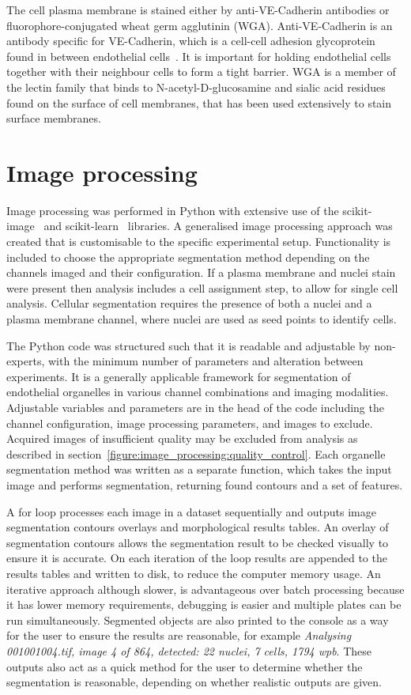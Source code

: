 The cell plasma membrane is stained either by anti-VE-Cadherin antibodies or fluorophore-conjugated wheat germ agglutinin (WGA). Anti-VE-Cadherin is an antibody specific for VE-Cadherin, which is a cell-cell adhesion glycoprotein found in between endothelial cells~\cite{Vestweber2008}. It is important for holding endothelial cells together with their neighbour cells to form a tight barrier. WGA is a member of the lectin family that binds to N-acetyl-D-glucosamine and sialic acid residues found on the surface of cell membranes, that has been used extensively to stain surface membranes.

\section{Image processing}
\label{endothelial_morphometry:image_processing}
Image processing was performed in Python with extensive use of the scikit-image~\cite{VanderWalt2014} and scikit-learn~\cite{Pedregosa2011} libraries. A generalised image processing approach was created that is customisable to the specific experimental setup. Functionality is included to choose the appropriate segmentation method depending on the channels imaged and their configuration. If a plasma membrane and nuclei stain were present then analysis includes a cell assignment step, to allow for single cell analysis. Cellular segmentation requires the presence of both a nuclei and a plasma membrane channel, where nuclei are used as seed points to identify cells.

The Python code was structured such that it is readable and adjustable by non-experts, with the minimum number of parameters and alteration between experiments. It is a generally applicable framework for segmentation of endothelial organelles in various channel combinations and imaging modalities. Adjustable variables and parameters are in the head of the code including the channel configuration, image processing parameters, and images to exclude. Acquired images of insufficient quality may be excluded from analysis as described in section~\ref{figure:image_processing:quality_control}. Each organelle segmentation method was written as a separate function, which takes the input image and performs segmentation, returning found contours and a set of features.

A for loop processes each image in a dataset sequentially and outputs image segmentation contours overlays and morphological results tables. An overlay of segmentation contours allows the segmentation result to be checked visually to ensure it is accurate. On each iteration of the loop results are appended to the results tables and written to disk, to reduce the computer memory usage. An iterative approach although slower, is advantageous over batch processing because it has lower memory requirements, debugging is easier and multiple plates can be run simultaneously. Segmented objects are also printed to the console as a way for the user to ensure the results are reasonable, for example \emph{Analysing 001001004.tif, image 4 of 864, detected: 22 nuclei, 7 cells, 1794 wpb}. These outputs also act as a quick method for the user to determine whether the segmentation is reasonable, depending on whether realistic outputs are given.

